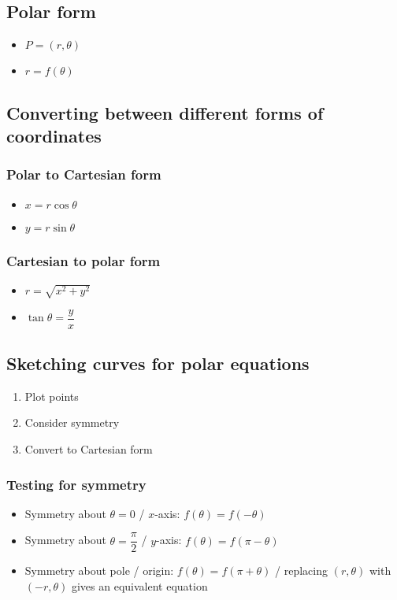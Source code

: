 \subsection{Polar form}
\begin{itemize}
	\item $P=(r,\theta)$
	\item $r=f(\theta)$
\end{itemize}

\subsection{Converting between different forms of coordinates}
\subsubsection{Polar to Cartesian form}
\begin{itemize}
	\item $x=r\cos\theta$
	\item $y=r\sin\theta$
\end{itemize}
\subsubsection{Cartesian to polar form}
\begin{itemize}
	\item $r=\sqrt{x^2+y^2}$
	\item $\tan\theta=\dfrac{y}{x}$
\end{itemize}


\subsection{Sketching curves for polar equations}
\begin{enumerate}
	\item Plot points
	\item Consider symmetry
	\item Convert to Cartesian form
\end{enumerate}

\subsubsection{Testing for symmetry}
\begin{itemize}
	\item Symmetry about $\theta=0$ / $x$-axis: $f(\theta)=f(-\theta)$
	\item Symmetry about $\theta=\dfrac{\pi}{2}$ / $y$-axis: $f(\theta)=f(\pi-\theta)$
	\item Symmetry about pole / origin: $f(\theta)=f(\pi+\theta)$ / replacing $(r,\theta)$ with $(-r,
	\theta)$ gives an equivalent equation
\end{itemize}


